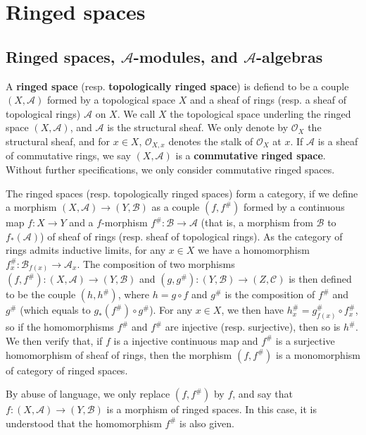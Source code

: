\section{Ringed spaces}
\subsection{Ringed spaces, \texorpdfstring{$\mathscr{A}$}{A}-modules, and \texorpdfstring{$\mathscr{A}$}{A}-algebras}
A \textbf{ringed space} (resp. \textbf{topologically ringed space}) is defiend to be a couple $(X,\mathscr{A})$ formed by a topological space $X$ and a sheaf of rings (resp. a sheaf of topological rings) $\mathscr{A}$ on $X$. We call $X$ the topological space underling the ringed space $(X,\mathscr{A})$, and $\mathscr{A}$ is the structural sheaf. We only denote by $\mathscr{O}_X$ the structural sheaf, and for $x\in X$, $\mathscr{O}_{X,x}$ denotes the stalk of $\mathscr{O}_X$ at $x$. If $\mathscr{A}$ is a sheaf of commutative rings, we say $(X,\mathscr{A})$ is a \textbf{commutative ringed space}. Without further specifications, we only consider commutative ringed spaces.\par
The ringed spaces (resp. topologically ringed spaces) form a category, if we define a morphism $(X,\mathscr{A})\to(Y,\mathscr{B})$ as a couple $(f,f^{\#})$ formed by a continuous map $f:X\to Y$ and a $f$-morphism $f^{\#}:\mathscr{B}\to\mathscr{A}$ (that is, a morphism from $\mathscr{B}$ to $f_*(\mathscr{A})$) of sheaf of rings (resp. sheaf of topological rings). As the category of rings admits inductive limits, for any $x\in X$ we have a homomorphism $f^{\#}_x:\mathscr{B}_{f(x)}\to\mathscr{A}_x$. The composition of two morphisms $(f,f^{\#}):(X,\mathscr{A})\to(Y,\mathscr{B})$ and $(g,g^{\#}):(Y,\mathscr{B})\to(Z,\mathscr{C})$ is then defined to be the couple $(h,h^{\#})$, where $h=g\circ f$ and $g^{\#}$ is the composition of $f^{\#}$ and $g^{\#}$ (which equals to $g_*(f^{\#})\circ g^{\#}$). For any $x\in X$, we then have $h^{\#}_x=g^{\#}_{f(x)}\circ f^{\#}_x$, so if the homomorphisms $f^{\#}$ and $f^{\#}$ are injective (resp. surjective), then so is $h^{\#}$. We then verify that, if $f$ is a injective continuous map and $f^{\#}$ is a surjective homomorphism of sheaf of rings, then the morphism $(f,f^{\#})$ is a monomorphism of category of ringed spaces.\par
By abuse of language, we only replace $(f,f^{\#})$ by $f$, and say that $f:(X,\mathscr{A})\to(Y,\mathscr{B})$ is a morphism of ringed spaces. In this case, it is understood that the homomorphism $f^{\#}$ is also given.\par
